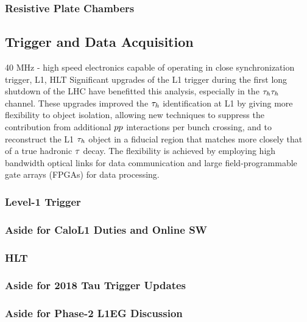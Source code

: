 \subsubsection{Resistive Plate Chambers}
\subsection{Trigger and Data Acquisition}
40 MHz - high speed electronics capable of operating in close synchronization
trigger, L1, HLT
Significant upgrades of the L1 trigger during the first long shutdown of the LHC have benefitted this analysis, especially in the $\tau_{h}\tau_{h}$ channel. These upgrades improved the $\tau_{h}$ identification at L1 by giving more flexibility to object isolation, allowing new techniques to suppress the contribution from additional $pp$ interactions per bunch
crossing, and to reconstruct the L1 $\tau_{h}$ object in a fiducial region that matches more closely that of a true hadronic $\tau$ decay. The flexibility is achieved by employing high bandwidth optical links for data communication and large field-programmable gate arrays (FPGAs) for data processing.

\subsubsection{Level-1 Trigger}
\subsubsection{Aside for CaloL1 Duties and Online SW}
\subsubsection{HLT}
\subsubsection{Aside for 2018 Tau Trigger Updates}
\subsubsection{Aside for Phase-2 L1EG Discussion}
